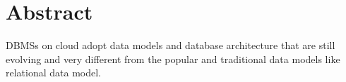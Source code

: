
\chapter{Abstract}

\acp{DBMS} on cloud adopt data models and database architecture that are still
evolving and very different from the popular and traditional data models like
relational data model. 

